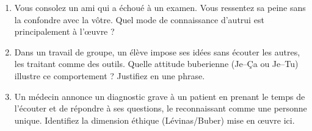 \documentclass[11pt]{article}
\begin{document}
\begin{exercice}
\begin{enumerate}
    \item Vous consolez un ami qui a échoué à un examen. Vous ressentez sa peine sans la confondre avec la vôtre. Quel mode de connaissance d'autrui est principalement à l'œuvre ? \underline{\hspace{5cm}}
    \item Dans un travail de groupe, un élève impose ses idées sans écouter les autres, les traitant comme des outils. Quelle attitude buberienne (Je–Ça ou Je–Tu) illustre ce comportement ? Justifiez en une phrase.
    \item Un médecin annonce un diagnostic grave à un patient en prenant le temps de l'écouter et de répondre à ses questions, le reconnaissant comme une personne unique. Identifiez la dimension éthique (Lévinas/Buber) mise en œuvre ici. \underline{\hspace{5cm}}
\end{enumerate}
\end{exercice}
\end{document}
